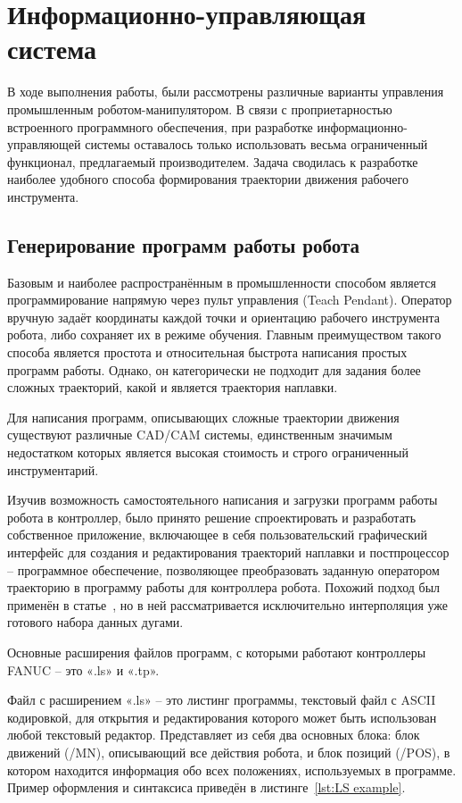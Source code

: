 \chapter{Информационно-управляющая система}
В ходе выполнения работы, были рассмотрены различные варианты управления промышленным роботом-манипулятором.
В связи с проприетарностью встроенного программного обеспечения, при разработке информационно-управляющей системы оставалось только использовать весьма ограниченный функционал, предлагаемый производителем.
Задача сводилась к разработке наиболее удобного способа формирования траектории движения рабочего инструмента.


\section{Генерирование программ работы робота}
Базовым и наиболее распространённым в промышленности способом является программирование напрямую через пульт управления (Teach Pendant).
Оператор вручную задаёт координаты каждой точки и ориентацию рабочего инструмента робота, либо сохраняет их в режиме обучения.
Главным преимуществом такого способа является простота и относительная быстрота написания простых программ работы.
Однако, он категорически не подходит для задания более сложных траекторий, какой и является траектория наплавки.

Для написания программ, описывающих сложные траектории движения существуют различные CAD/CAM системы, единственным значимым недостатком которых является высокая стоимость и строго ограниченный инструментарий.

Изучив возможность самостоятельного написания и загрузки программ работы робота в контроллер, было принято решение спроектировать и разработать собственное приложение, включающее в себя пользовательский графический интерфейс для создания и редактирования траекторий наплавки и постпроцессор -- программное обеспечение, позволяющее преобразовать заданную оператором траекторию в программу работы для контроллера робота.
Похожий подход был применён в статье~\cite{Nagata_2017}, но в ней рассматривается исключительно интерполяция уже готового набора данных дугами.

Основные расширения файлов программ, с которыми работают контроллеры FANUC -- это «.ls» и «.tp».

Файл с расширением «.ls» -- это листинг программы, текстовый файл с ASCII кодировкой, для открытия и редактирования которого может быть использован любой текстовый редактор.
Представляет из себя два основных блока: блок движений (/MN), описывающий все действия робота, и блок позиций (/POS), в котором находится информация обо всех положениях, используемых в программе.
Пример оформления и синтаксиса приведён в листинге~\ref{lst:LS example}.

